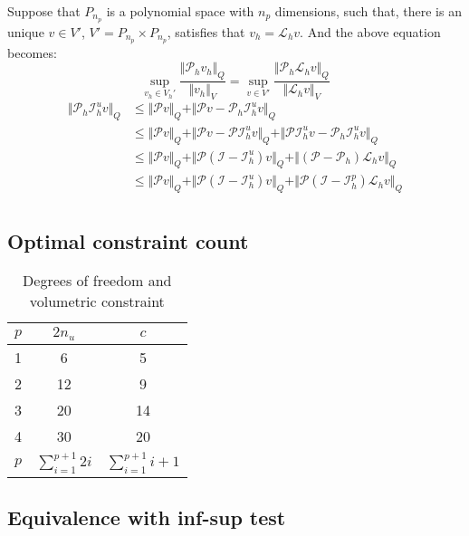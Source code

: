Suppose that $P_{n_p}$ is a polynomial space with $n_p$ dimensions, such that, there is an unique $v \in V'$, $V'=P_{n_p}\times P_{n_p}$, satisfies that $v_h = \mathcal L_h v$. And the above equation becomes:
\begin{equation}
\sup_{v_h \in V_h'} \frac{\Vert \mathcal P_h v_h \Vert_Q}{\Vert v_h \Vert_V} = \sup_{v \in V'} \frac{\Vert \mathcal P_h \mathcal L_h v \Vert_Q}{\Vert \mathcal L_h v \Vert_V}
\end{equation}
\begin{equation}
\begin{split}
    \Vert \mathcal P_h \mathcal I^u_h v \Vert_Q &\le \Vert \mathcal P v \Vert_Q + \Vert \mathcal P v - \mathcal P_h \mathcal I^u_h v \Vert_Q \\
    &\le \Vert \mathcal P v \Vert_Q + \Vert \mathcal P v - \mathcal P \mathcal I^u_h v \Vert_Q + \Vert \mathcal P \mathcal I^u_h v - \mathcal P_h \mathcal I^u_h v \Vert_Q \\
    &\le \Vert \mathcal P v \Vert_Q + \Vert \mathcal P(\mathcal I - \mathcal I^u_h) v \Vert_Q + \Vert (\mathcal P - \mathcal P_h) \mathcal L_h v \Vert_Q \\
    &\le \Vert \mathcal P v \Vert_Q + \Vert \mathcal P(\mathcal I - \mathcal I^u_h) v \Vert_Q + \Vert \mathcal P(\mathcal I - \mathcal I^p_h) \mathcal L_h v \Vert_Q \\
\end{split}
\end{equation}

\subsection{Optimal constraint count}
\begin{table}[ht!]
\centering
\caption{Degrees of freedom and volumetric constraint}
\begin{tabular}{ccc}
\toprule
$p$ & $2n_u$ & $c$ \\
\midrule
1 & 6 & 5 \\
2 & 12 & 9 \\
3 & 20 & 14 \\
4 & 30 & 20 \\
$p$ & $\sum_{i=1}^{p+1}2i$ & $\sum_{i=1}^{p+1}i+1$ \\
\bottomrule
\end{tabular}
\end{table}
\subsection{Equivalence with inf-sup test}
